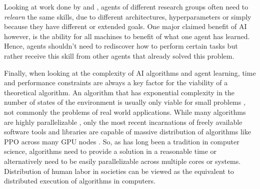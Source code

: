 \documentclass[12pt,a4paper]{article}
\begin{document}


Looking at work done by \cite{bansal2017emergent} and \cite{proximalpolicyopt}, agents of different research groups often need to \emph{relearn} the same skills, due to different architectures, hyperparameters or simply because they have different or extended goals. One major claimed benefit of \ac{AI} however, is the ability for all machines to benefit of what one agent has learned. Hence, agents shouldn't need to rediscover how to perform certain tasks but rather receive this skill from other agents that already solved this problem.

Finally, when looking at the complexity of AI algorithms and agent learning, time and performance constraints are always a key factor for the viability of a theoretical algorithm. An algorithm that has exponential complexity in the number of states of the environment is usually only viable for small problems \cite[p.839f.]{russell2016artificial}, not commonly the problems of real world applications. While many algorithms are highly parallelizable \cite{tensorflow2015-whitepaper}, only the most recent incarnations of freely available software tools and libraries are capable of massive distribution of algorithms like \ac{PPO} across many \ac{GPU} nodes \cite{hafner2017agents}. So, as has long been a tradition in computer science, algorithms need to provide a solution in a reasonable time or alternatively need to be easily parallelizable across multiple cores or systems. Distribution of human labor in societies can be viewed as the equivalent to distributed execution of algorithms in computers.
\end{document}
